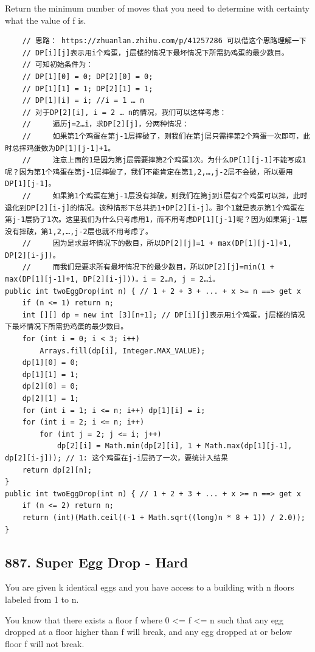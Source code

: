 \documentclass[9pt, b5paaper]{book}
\begin{document}
Return the minimum number of moves that you need to determine with certainty what the value of f is.
\begin{verbatim}
    // 思路： https://zhuanlan.zhihu.com/p/41257286 可以借这个思路理解一下
    // DP[i][j]表示用i个鸡蛋，j层楼的情况下最坏情况下所需扔鸡蛋的最少数目。
    // 可知初始条件为：
    // DP[1][0] = 0; DP[2][0] = 0;
    // DP[1][1] = 1; DP[2][1] = 1;
    // DP[1][i] = i; //i = 1 … n
    // 对于DP[2][i], i = 2 … n的情况，我们可以这样考虑：
    //     遍历j=2…i，求DP[2][j]，分两种情况：
    //     如果第1个鸡蛋在第j-1层摔破了，则我们在第j层只需摔第2个鸡蛋一次即可，此时总摔鸡蛋数为DP[1][j-1]+1。
    //     注意上面的1是因为第j层需要摔第2个鸡蛋1次。为什么DP[1][j-1]不能写成1呢？因为第1个鸡蛋在第j-1层摔破了，我们不能肯定在第1,2,…,j-2层不会破，所以要用DP[1][j-1]。
    //     如果第1个鸡蛋在第j-1层没有摔破，则我们在第j到i层有2个鸡蛋可以摔，此时退化到DP[2][i-j]的情况。该种情形下总共扔1+DP[2][i-j]。那个1就是表示第1个鸡蛋在第j-1层扔了1次。这里我们为什么只考虑用1，而不用考虑DP[1][j-1]呢？因为如果第j-1层没有摔破，第1,2,…,j-2层也就不用考虑了。
    //     因为是求最坏情况下的数目，所以DP[2][j]=1 + max(DP[1][j-1]+1, DP[2][i-j])。
    //     而我们是要求所有最坏情况下的最少数目，所以DP[2][j]=min(1 + max(DP[1][j-1]+1, DP[2][i-j]))。i = 2…n, j = 2…i。
public int twoEggDrop(int n) { // 1 + 2 + 3 + ... + x >= n ==> get x
    if (n <= 1) return n;
    int [][] dp = new int [3][n+1]; // DP[i][j]表示用i个鸡蛋，j层楼的情况下最坏情况下所需扔鸡蛋的最少数目。
    for (int i = 0; i < 3; i++) 
        Arrays.fill(dp[i], Integer.MAX_VALUE);
    dp[1][0] = 0;
    dp[1][1] = 1;
    dp[2][0] = 0;
    dp[2][1] = 1;
    for (int i = 1; i <= n; i++) dp[1][i] = i;
    for (int i = 2; i <= n; i++) 
        for (int j = 2; j <= i; j++) 
            dp[2][i] = Math.min(dp[2][i], 1 + Math.max(dp[1][j-1], dp[2][i-j])); // 1: 这个鸡蛋在j-i层扔了一次，要统计入结果
    return dp[2][n];
}
public int twoEggDrop(int n) { // 1 + 2 + 3 + ... + x >= n ==> get x
    if (n <= 2) return n;
    return (int)(Math.ceil((-1 + Math.sqrt((long)n * 8 + 1)) / 2.0));
}
\end{verbatim}
\subsection{887. Super Egg Drop - Hard}
\label{sec-1-4-49}
You are given k identical eggs and you have access to a building with n floors labeled from 1 to n.

You know that there exists a floor f where 0 <= f <= n such that any egg dropped at a floor higher than f will break, and any egg dropped at or below floor f will not break.
\end{document}
